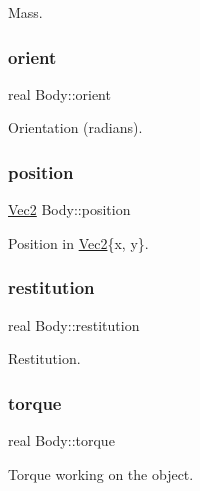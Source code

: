 Mass. 

\mbox{\label{struct_body_a93534f084248dd60be496754361c1a22}} 
\subsubsection{\texorpdfstring{orient}{orient}}
{\footnotesize\ttfamily real Body\+::orient}



Orientation (radians). 

\mbox{\label{struct_body_a659001c4570d0ad46bf609ab06447860}} 
\subsubsection{\texorpdfstring{position}{position}}
{\footnotesize\ttfamily \mbox{\hyperlink{struct_vec2}{Vec2}} Body\+::position}



Position in \mbox{\hyperlink{struct_vec2}{Vec2}}\{x, y\}. 

\mbox{\label{struct_body_aa57d627e73de706e87540b07b61d867a}} 
\subsubsection{\texorpdfstring{restitution}{restitution}}
{\footnotesize\ttfamily real Body\+::restitution}



Restitution. 

\mbox{\label{struct_body_a269761d1be497882d3f3a2aef4847152}} 
\subsubsection{\texorpdfstring{torque}{torque}}
{\footnotesize\ttfamily real Body\+::torque}



Torque working on the object. 

\mbox{\label{struct_body_a3723eaa2db4c9a3ac68b9745e11a0a40}} 
